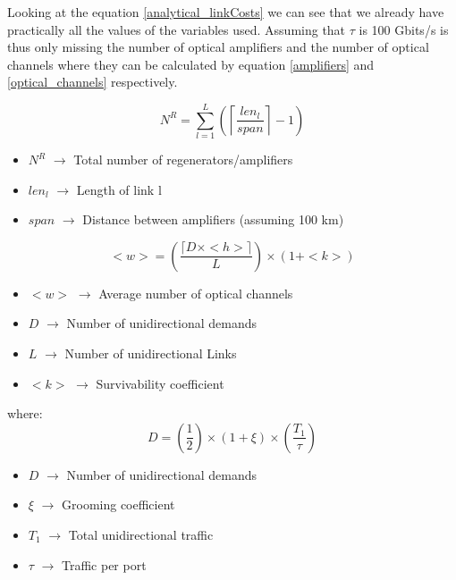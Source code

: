 \vspace{11pt}
Looking at the equation \ref{analytical_linkCosts} we can see that we already have practically all the values of the variables used. Assuming that $\tau$ is 100 Gbits/s is thus only missing the number of optical amplifiers and the number of optical channels where they can be calculated by equation \ref{amplifiers} and \ref{optical_channels} respectively.

\begin{equation}
N^R = \sum\limits_{l=1}^L\left(\left\lceil\frac{len_l}{span}\right\rceil-1\right)
\label{amplifiers}
\end{equation}


\begin{itemize}
\item{$N^R$			$\rightarrow$ Total number of regenerators/amplifiers}
\item{$len_l$		$\rightarrow$ Length of link l}
\item{$span$		$\rightarrow$ Distance between amplifiers (assuming 100 km)}	
\end{itemize}	


\begin{equation}
<w> = \left( \frac{\lceil D \times <h> \rceil}{L} \right) \times \left( 1 + <k>\right)
\label{optical_channels}
\end{equation}


\begin{itemize}
\item{$<w>$		$\rightarrow$ Average number of optical channels}
\item{$D$  		$\rightarrow$ Number of unidirectional demands}
\item{$L$		$\rightarrow$ Number of unidirectional Links}	
\item{$<k>$		$\rightarrow$ Survivability coefficient}
\end{itemize}	

where:
\begin{equation}
D = \left(\frac{1}{2}\right) \times \left( 1 + \xi \right) \times \left(\frac{T_1}{\tau}\right)
\label{demands}
\end{equation}


\begin{itemize}
\item{$D$  		$\rightarrow$ Number of unidirectional demands}
\item{$\xi$		$\rightarrow$ Grooming coefficient}
\item{$T_1$		$\rightarrow$ Total unidirectional traffic}	
\item{$\tau$	$\rightarrow$ Traffic per port}
\end{itemize}

